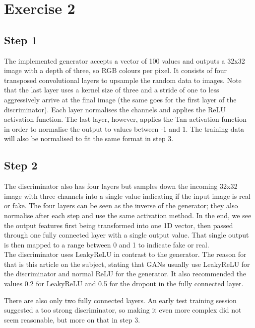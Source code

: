 \section{Exercise 2}
\subsection{Step 1}
The implemented generator accepts a vector of 100 values and outputs a 32x32 image with a depth of three, so RGB colours per pixel. It consists of four transposed convolutional layers to upsample the random data to images. Note that the last layer uses a kernel size of three and a stride of one to less aggressively arrive at the final image (the  same goes for the first layer of the discriminator). Each layer normalises the channels and applies the ReLU activation function. The last layer, however, applies the Tan activation function in order to normalise the output to values between -1 and 1. The training data will also be normalised to fit the same format in step 3. 




\subsection{Step 2}
The discriminator also has four layers but samples down the incoming 32x32 image with three channels into a single value indicating if the input image is real or fake. The four layers can be seen as the inverse of the generator; they also normalise after each step and use the same activation method. In the end, we see the output features first being transformed into one 1D vector, then passed through one fully connected layer with a single output value. That single output is then mapped to a range between 0 and 1 to indicate fake or real. \\
The discriminator uses LeakyReLU in contrast to the generator. The reason for that is this article\cite{brownlee_tips_2019} on the subject, stating that GANs usually use LeakyReLU for the discriminator and normal ReLU for the generator. It also recommended the values 0.2 for LeakyReLU and 0.5 for the dropout in the fully connected layer. 

There are also only two fully connected layers. An early test training session suggested a too strong discriminator, so making it even more complex did not seem reasonable, but more on that in step 3. 



